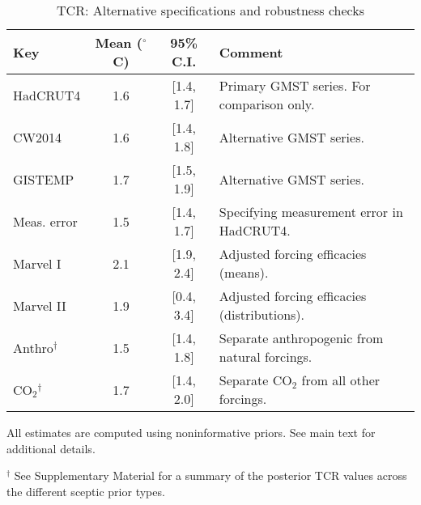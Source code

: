 \documentclass[smallextended]{svjour3}       %
\begin{document}
\begin{table}[t] \centering 
    \caption{TCR: Alternative specifications and robustness checks} 
    \label{tab:sensitivity} 
    \begin{threeparttable} %
    \begin{tabular}{@{\extracolsep{5pt}} lccl} 
        \toprule %
        Key                 & Mean ($^\circ$C)  & 95\% C.I.  & Comment \\ 
        \midrule %
        HadCRUT4            & 1.6               & [1.4, 1.7] & Primary GMST series. For comparison only. \\ 
        CW2014              & 1.6               & [1.4, 1.8] & Alternative GMST series. \\ 
        GISTEMP             & 1.7               & [1.5, 1.9] & Alternative GMST series. \\ 
        Meas. error         & 1.5               & [1.4, 1.7] & Specifying measurement error in HadCRUT4. \\ 
        Marvel I            & 2.1               & [1.9, 2.4] & Adjusted forcing efficacies (means). \\ 
        Marvel II           & 1.9               & [0.4, 3.4] & Adjusted forcing efficacies (distributions). \\ 
        Anthro$^\dagger$    & 1.5               & [1.4, 1.8] & Separate anthropogenic from natural forcings. \\ 
        CO$_2$$^\dagger$    & 1.7               & [1.4, 2.0] & Separate CO$_2$ from all other forcings. \\ 
        \bottomrule 
    \end{tabular} 
    \begin{tablenotes}
        \footnotesize
        \item All estimates are computed using noninformative priors. See main text for additional details.
        \item $^\dagger$ See Supplementary Material for a summary of the posterior TCR values across the different sceptic prior types.
    \end{tablenotes}
\end{threeparttable} 
\end{table}
\end{document}
